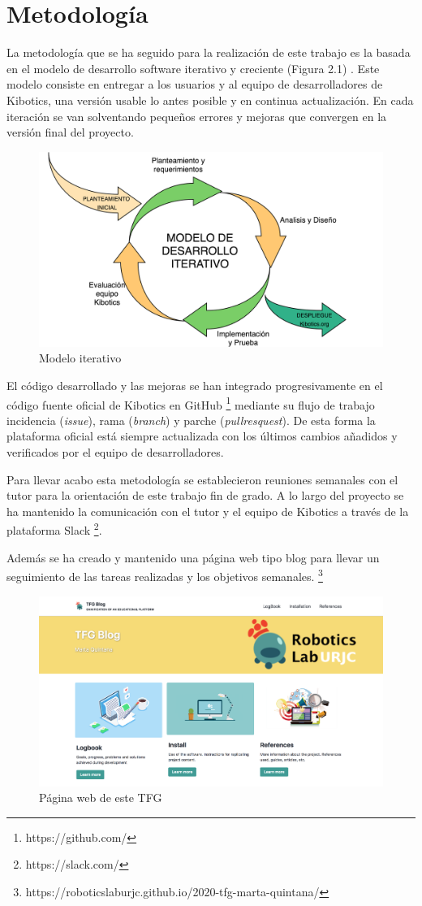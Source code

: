  
\section{Metodología}

La metodología que se ha seguido para la realización de este trabajo es la basada en el modelo de desarrollo software iterativo y creciente (Figura 2.1) \cite{modeloiter}.
Este modelo consiste en entregar a los usuarios y al equipo de desarrolladores de Kibotics, una versión usable lo antes posible y en continua actualización. En cada iteración se van solventando pequeños errores y mejoras que convergen en la versión final del proyecto.

\begin{figure}[H]
    \centering
    \includegraphics[width=0.6\columnwidth]{chapters/images/metodologiaiterativa.png}
    \caption{Modelo iterativo}
    \label{fig:my_label}
\end{figure}


El código desarrollado y las mejoras se han integrado progresivamente en el código fuente oficial de Kibotics en GitHub \footnote{https://github.com/} mediante su flujo de trabajo  incidencia (\textit{issue}), rama (\textit{branch}) y parche (\textit{pullresquest}). De esta forma la plataforma oficial está siempre actualizada con los últimos cambios añadidos y verificados por el equipo de desarrolladores.

Para llevar acabo esta metodología se establecieron reuniones semanales con el tutor para la orientación de este trabajo fin de grado. A lo largo del proyecto se ha mantenido la comunicación con el tutor y el equipo de Kibotics a través de la plataforma Slack \footnote{https://slack.com/}. 



Además se ha creado y mantenido  una página web tipo blog para llevar un seguimiento de las tareas realizadas y los objetivos semanales. \footnote{https://roboticslaburjc.github.io/2020-tfg-marta-quintana/}

\begin{figure}[H]
    \centering
    \includegraphics[width=0.6\linewidth]{chapters/images/webtfg.png}
    \caption{Página web de este TFG}
    \label{fig:my_label}
\end{figure}

